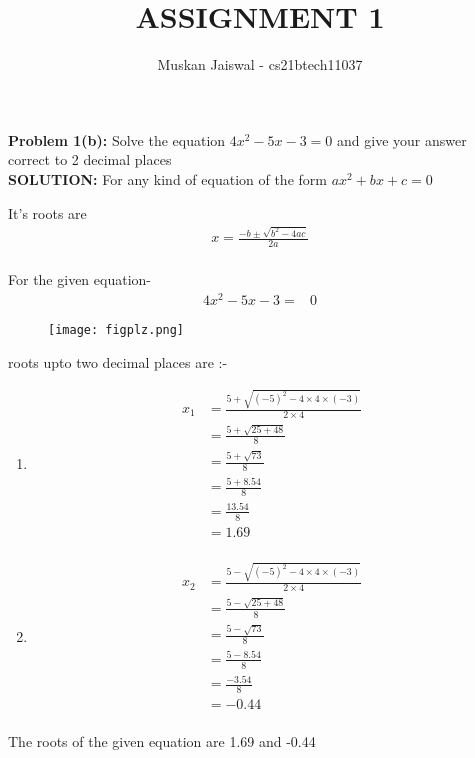 \documentclass[journal,12pt,two column]{IEEEtran}
\title{ASSIGNMENT 1 }
\author{Muskan Jaiswal - cs21btech11037}
\begin{document}
\maketitle
\textbf{Problem 1(b):} Solve the equation $4x^2-5x-3=0$ and give your answer correct to 2 decimal places
\\

\textbf{SOLUTION:}     For any kind of equation of the form  $ax^2+bx+c=0$

It's roots are
\\

\begin{align*}
x={\frac{-b\pm\sqrt{b^2-4ac}}{2a}}\\
\end{align*}

For the given equation-
\begin{align}
    4x^2-5x-3=&0
\end{align}
\begin{figure}
\texttt{[image: figplz.png]}
\end{figure}

roots upto two decimal places are :-
    
 \begin{enumerate}
     \item 
 \begin{align*} 
x_1 &= \frac{5+\sqrt{(-5)^2-4\times4\times(-3)}}{2\times4}\\ 
&=\frac{5+\sqrt{25+48}}{8}\\ 
&=\frac{5+\sqrt{73}}{8}\\
 &=\frac{5+8.54}{8} \\ 
 &=\frac{13.54}{8}\\ 
 &=1.69 \\ 
\end{align*}
\item
\begin{align*}
x_2 &=\frac{5-\sqrt{(-5)^2-4\times4\times(-3)}}{2\times4}\\ 
&=\frac{5-\sqrt{25+48}}{8}\\ 
&=\frac{5-\sqrt{73}}{8}\\ 
&=\frac{5-8.54}{8} \\ 
&=\frac{-3.54}{8} \\ 
&=-0.44\\
\end{align*}
\end{enumerate}

The roots of the given equation are 1.69 and -0.44
\end{document}
